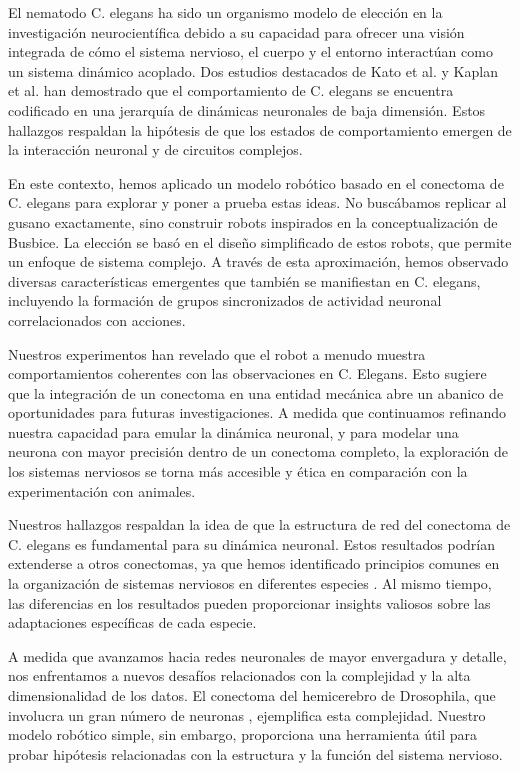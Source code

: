 El nematodo C. elegans ha sido un organismo modelo de elección en la investigación neurocientífica debido a su capacidad para ofrecer una visión integrada de cómo el sistema nervioso, el cuerpo y el entorno interactúan como un sistema dinámico acoplado. Dos estudios destacados de Kato et al. \cite{kato_global_2015} y Kaplan et al. \cite{kaplan_nested_2020} han demostrado que el comportamiento de C. elegans se encuentra codificado en una jerarquía de dinámicas neuronales de baja dimensión. Estos hallazgos respaldan la hipótesis de que los estados de comportamiento emergen de la interacción neuronal y de circuitos complejos.

En este contexto, hemos aplicado un modelo robótico basado en el conectoma de C. elegans para explorar y poner a prueba estas ideas. No buscábamos replicar al gusano exactamente, sino construir robots inspirados en la conceptualización de Busbice. La elección se basó en el diseño simplificado de estos robots, que permite un enfoque de sistema complejo. A través de esta aproximación, hemos observado diversas características emergentes que también se manifiestan en C. elegans, incluyendo la formación de grupos sincronizados de actividad neuronal correlacionados con acciones.

Nuestros experimentos han revelado que el robot a menudo muestra comportamientos coherentes con las observaciones en C. Elegans. Esto sugiere que la integración de un conectoma en una entidad mecánica abre un abanico de oportunidades para futuras investigaciones. A medida que continuamos refinando nuestra capacidad para emular la dinámica neuronal, y para modelar una neurona con mayor precisión dentro de un conectoma completo, la exploración de los sistemas nerviosos se torna más accesible y ética en comparación con la experimentación con animales.

Nuestros hallazgos respaldan la idea de que la estructura de red del conectoma de C. elegans es fundamental para su dinámica neuronal. Estos resultados podrían extenderse a otros conectomas, ya que hemos identificado principios comunes en la organización de sistemas nerviosos en diferentes especies \cite{heuvel_comparative_2016}. Al mismo tiempo, las diferencias en los resultados pueden proporcionar insights valiosos sobre las adaptaciones específicas de cada especie.

A medida que avanzamos hacia redes neuronales de mayor envergadura y detalle, nos enfrentamos a nuevos desafíos relacionados con la complejidad y la alta dimensionalidad de los datos. El conectoma del hemicerebro de Drosophila, que involucra un gran número de neuronas \cite{scheffer_connectome_2020}, ejemplifica esta complejidad. Nuestro modelo robótico simple, sin embargo, proporciona una herramienta útil para probar hipótesis relacionadas con la estructura y la función del sistema nervioso.

